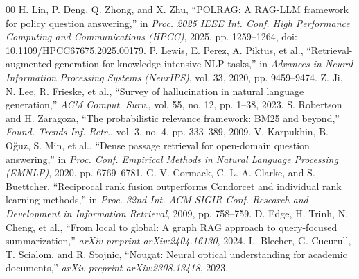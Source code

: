 \documentclass[10pt,a4paper,conference]{IEEEtran}
\begin{document}
\begin{thebibliography}{00}
 H. Lin, P. Deng, Q. Zhong, and X. Zhu, ``POLRAG: A RAG-LLM framework for policy question answering,'' in \emph{Proc. 2025 IEEE Int. Conf. High Performance Computing and Communications (HPCC)}, 2025, pp. 1259--1264, doi: 10.1109/HPCC67675.2025.00179.
 P. Lewis, E. Perez, A. Piktus, et al., ``Retrieval-augmented generation for knowledge-intensive NLP tasks,'' in \emph{Advances in Neural Information Processing Systems (NeurIPS)}, vol. 33, 2020, pp. 9459--9474.
 Z. Ji, N. Lee, R. Frieske, et al., ``Survey of hallucination in natural language generation,'' \emph{ACM Comput. Surv.}, vol. 55, no. 12, pp. 1--38, 2023.
 S. Robertson and H. Zaragoza, ``The probabilistic relevance framework: BM25 and beyond,'' \emph{Found. Trends Inf. Retr.}, vol. 3, no. 4, pp. 333--389, 2009.
 V. Karpukhin, B. O\u{g}uz, S. Min, et al., ``Dense passage retrieval for open-domain question answering,'' in \emph{Proc. Conf. Empirical Methods in Natural Language Processing (EMNLP)}, 2020, pp. 6769--6781.
 G. V. Cormack, C. L. A. Clarke, and S. Buettcher, ``Reciprocal rank fusion outperforms Condorcet and individual rank learning methods,'' in \emph{Proc. 32nd Int. ACM SIGIR Conf. Research and Development in Information Retrieval}, 2009, pp. 758--759.
 D. Edge, H. Trinh, N. Cheng, et al., ``From local to global: A graph RAG approach to query-focused summarization,'' \emph{arXiv preprint arXiv:2404.16130}, 2024.
 L. Blecher, G. Cucurull, T. Scialom, and R. Stojnic, ``Nougat: Neural optical understanding for academic documents,'' \emph{arXiv preprint arXiv:2308.13418}, 2023.
\end{thebibliography}
\end{document}
